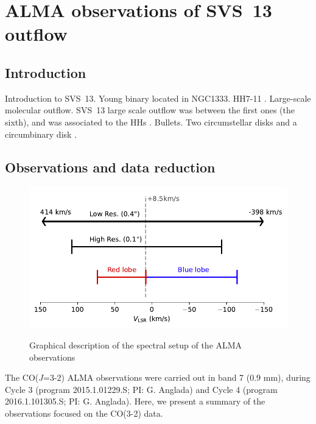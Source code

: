 \documentclass[12pt]{mythesis}
\begin{document}
\chapter{ALMA observations of SVS~13 outflow}

\section{Introduction}

Introduction to SVS~13. Young binary located in NGC1333. HH7-11 \citep{hartigan2019}. Large-scale molecular outflow. SVS~13 large scale outflow was between the first ones (the sixth), and was associated to the HHs \citep{snell1981}. Bullets. 
Two circumstellar disks and a circumbinary disk \citep{diaz-rodriguez2022} \citep{diaz-rodriguezphd}.


\section{Observations and data reduction}\label{sec:observations}

\begin{figure}[h!]
\begin{center}
\includegraphics[width=1.0\textwidth]{figures/spectral_setup.pdf}\\
\caption[Spectral setup]{
	Graphical description of the spectral setup of the ALMA observations
\label{fig:spectralsetup}}
\end{center}
 \end{figure}



The CO($J$=3-2) ALMA observations were carried out in band 7 (0.9 mm), during Cycle 3 (program 2015.1.01229.S; PI: G. Anglada) and Cycle 4 (program 2016.1.101305.S; PI: G. Anglada). Here, we present a summary of the observations focused on the CO(3-2) data.
\end{document}

